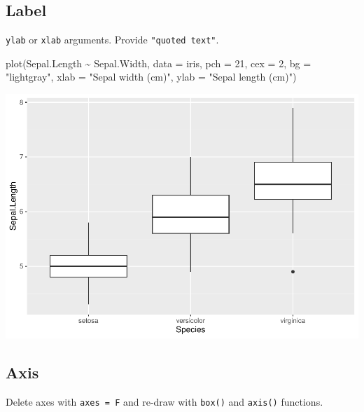 \documentclass[
]{book}
\newenvironment{Shaded}{\begin{snugshade}}{\end{snugshade}}
\newcommand{\AttributeTok}[1]{\textcolor[rgb]{0.77,0.63,0.00}{#1}}
\newcommand{\DecValTok}[1]{\textcolor[rgb]{0.00,0.00,0.81}{#1}}
\newcommand{\FunctionTok}[1]{\textcolor[rgb]{0.00,0.00,0.00}{#1}}
\newcommand{\NormalTok}[1]{#1}
\newcommand{\SpecialCharTok}[1]{\textcolor[rgb]{0.00,0.00,0.00}{#1}}
\newcommand{\StringTok}[1]{\textcolor[rgb]{0.31,0.60,0.02}{#1}}
\begin{document}
\hypertarget{label}{%
\subsection{Label}\label{label}}

\texttt{ylab} or \texttt{xlab} arguments. Provide \texttt{"quoted\ text"}.

\begin{Shaded}
\begin{Highlighting}[]
\FunctionTok{plot}\NormalTok{(Sepal.Length }\SpecialCharTok{\textasciitilde{}}\NormalTok{ Sepal.Width, }\AttributeTok{data =}\NormalTok{ iris,}
     \AttributeTok{pch =} \DecValTok{21}\NormalTok{, }\AttributeTok{cex =} \DecValTok{2}\NormalTok{, }\AttributeTok{bg =} \StringTok{"lightgray"}\NormalTok{,}
     \AttributeTok{xlab =} \StringTok{"Sepal width (cm)"}\NormalTok{, }\AttributeTok{ylab =} \StringTok{"Sepal length (cm)"}\NormalTok{)}
\end{Highlighting}
\end{Shaded}

\begin{center}\includegraphics{biostats_files/figure-latex/unnamed-chunk-121-1} \end{center}

\hypertarget{axis}{%
\subsection{Axis}\label{axis}}

Delete axes with \texttt{axes\ =\ F} and re-draw with \texttt{box()} and \texttt{axis()} functions.
\end{document}
